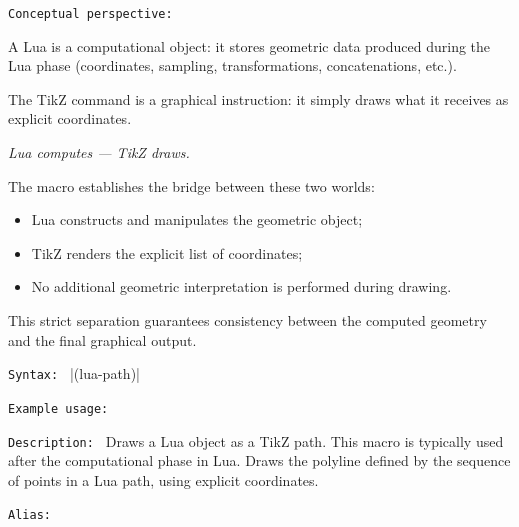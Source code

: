 \medskip
\texttt{Conceptual perspective:}

A Lua  is a computational object: it stores geometric data
produced during the Lua phase (coordinates, sampling, transformations,
concatenations, etc.).

The TikZ command  is a graphical instruction:
it simply draws what it receives as explicit coordinates.

\medskip
\emph{Lua computes — TikZ draws.}

\medskip
The macro  establishes the
bridge between these two worlds:

\begin{itemize}
\item Lua constructs and manipulates the geometric object;
\item TikZ renders the explicit list of coordinates;
\item No additional geometric interpretation is performed during drawing.
\end{itemize}

This strict separation guarantees consistency between the computed
geometry and the final graphical output.


\texttt{Syntax: } |\tkzDrawCoordinates[<options>](lua-path)|

\texttt{Example usage: }


\begin{tkzexample}[latex=.5\textwidth]
\end{tkzexample}


\medskip
\texttt{Description: }
Draws a Lua  object as a TikZ path. This macro is typically used
after the computational phase in Lua. Draws the polyline defined by the sequence of points in a Lua path, using explicit  coordinates.


\medskip
\texttt{Alias: } %
\label{subsec:tkzDrawPath}

\begin{quote}
\end{quote}

